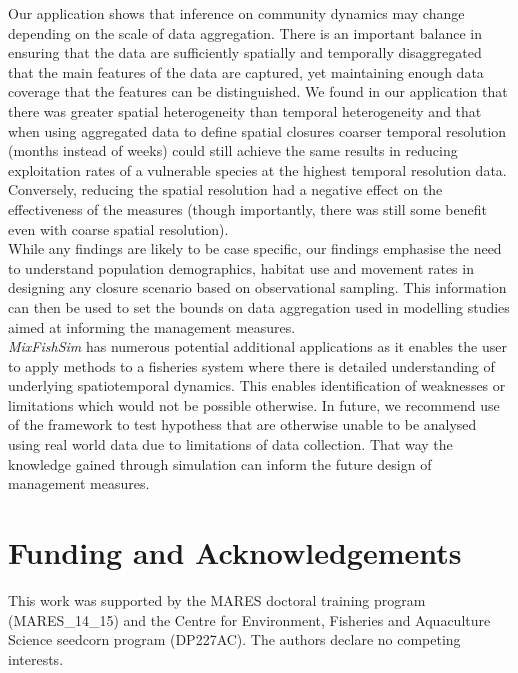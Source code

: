 \documentclass[review]{elsarticle}
\begin{document}
Our application shows that inference on community dynamics may change depending
on the scale of data aggregation. There is an important balance in ensuring
that the data are sufficiently spatially and temporally disaggregated that the
main features of the data are captured, yet maintaining enough data coverage
that the features can be distinguished. We found in our application that there
was greater spatial heterogeneity than temporal heterogeneity and that when
using aggregated data to define spatial closures coarser temporal resolution
(months instead of weeks) could still achieve the same results in reducing
exploitation rates of a vulnerable species at the highest temporal resolution
data. Conversely, reducing the spatial resolution had a negative effect on the
effectiveness of the measures (though importantly, there was still some benefit
even with coarse spatial resolution). \\

While any findings are likely to be case specific, our findings emphasise the
need to understand population demographics, habitat use and movement rates in
designing any closure scenario based on observational sampling. This
information can then be used to set the bounds on data aggregation used in
modelling studies aimed at informing the management measures. \\ 

\textit{MixFishSim} has numerous potential additional applications as it
enables the user to apply methods to a fisheries system where there is detailed
understanding of underlying spatiotemporal dynamics. This enables
identification of weaknesses or limitations which would not be possible
otherwise. In future, we recommend use of the framework to test
hypothess that are otherwise unable to be analysed using real
world data due to limitations of data collection. That way the knowledge gained
through simulation can inform the future design of management measures. 

\section*{Funding and Acknowledgements} This work was supported by the MARES
doctoral training program (MARES\_14\_15) and the Centre for Environment,
Fisheries and Aquaculture Science seedcorn program (DP227AC). The authors declare no competing
interests.
\end{document}
